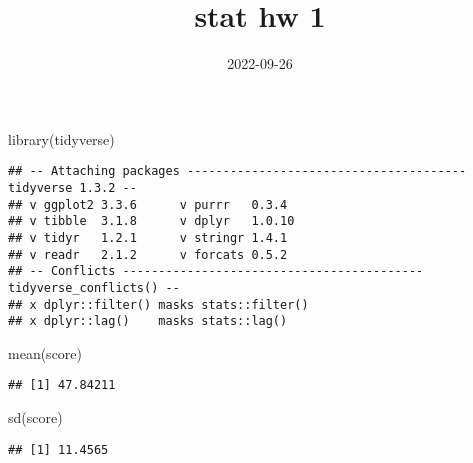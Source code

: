 \documentclass[
]{article}
\title{stat hw 1}
\author{}
\date{\vspace{-2.5em}2022-09-26}
\newenvironment{Shaded}{\begin{snugshade}}{\end{snugshade}}
\newcommand{\FunctionTok}[1]{\textcolor[rgb]{0.00,0.00,0.00}{#1}}
\newcommand{\NormalTok}[1]{#1}
\newcommand{\OtherTok}[1]{\textcolor[rgb]{0.56,0.35,0.01}{#1}}
\newcommand{\SpecialCharTok}[1]{\textcolor[rgb]{0.00,0.00,0.00}{#1}}
\newcommand{\StringTok}[1]{\textcolor[rgb]{0.31,0.60,0.02}{#1}}
\begin{document}
\maketitle

\begin{Shaded}
\begin{Highlighting}[]
\FunctionTok{library}\NormalTok{(tidyverse)}
\end{Highlighting}
\end{Shaded}

\begin{verbatim}
## -- Attaching packages --------------------------------------- tidyverse 1.3.2 --
## v ggplot2 3.3.6      v purrr   0.3.4 
## v tibble  3.1.8      v dplyr   1.0.10
## v tidyr   1.2.1      v stringr 1.4.1 
## v readr   2.1.2      v forcats 0.5.2 
## -- Conflicts ------------------------------------------ tidyverse_conflicts() --
## x dplyr::filter() masks stats::filter()
## x dplyr::lag()    masks stats::lag()
\end{verbatim}

\begin{Shaded}
\end{Shaded}

\begin{Shaded}
\begin{Highlighting}[]
\FunctionTok{mean}\NormalTok{(score)}
\end{Highlighting}
\end{Shaded}

\begin{verbatim}
## [1] 47.84211
\end{verbatim}

\begin{Shaded}
\begin{Highlighting}[]
\FunctionTok{sd}\NormalTok{(score)}
\end{Highlighting}
\end{Shaded}

\begin{verbatim}
## [1] 11.4565
\end{verbatim}
\end{document}
